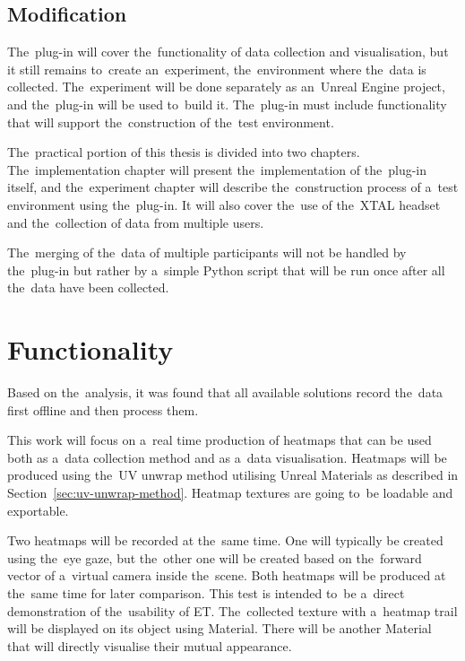\subsection{Modification}

The~plug-in will cover the~functionality of data collection and visualisation, but it still remains to~create an~experiment, the~environment where the~data is collected. The~experiment will be done separately as an~Unreal Engine project, and the~plug-in will be used to~build it. The~plug-in must include functionality that will support the~construction of the~test environment. 

The~practical portion of this thesis is divided into two chapters. The~implementation chapter will present the~implementation of the~plug-in itself, and the~experiment chapter will describe the~construction process of a~test environment using the~plug-in. It will also cover the~use of the~XTAL headset and the~collection of data from multiple users.

The~merging of the~data of multiple participants will not be handled by the~plug-in but rather by a~simple Python script that will be run once after all the~data have been collected.

\section{Functionality}
\label{sec:plugin-functionality}

Based on the~analysis, it was found that all available solutions record the~data first offline and then process them.

This work will focus on a~real time production of heatmaps that can be used both as a~data collection method and as a~data visualisation. Heatmaps will be produced using the~UV unwrap method utilising Unreal Materials as described in Section~\ref{sec:uv-unwrap-method}. Heatmap textures are going to~be loadable and exportable. 

Two heatmaps will be recorded at the~same time. One will typically be created using the~eye gaze, but the~other one will be created based on the~forward vector of a~virtual camera inside the~scene. Both heatmaps will be produced at the~same time for later comparison. This test is intended to~be a~direct demonstration of the~usability of ET. The~collected texture with a~heatmap trail will be displayed on its object using Material. There will be another Material that will directly visualise their mutual appearance.

